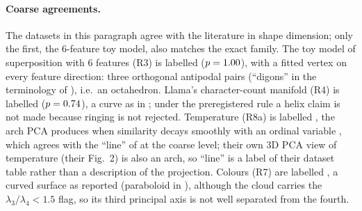 \paragraph{Coarse agreements.} The datasets in this paragraph agree with the literature in shape dimension; only the first, the 6-feature toy model, also matches the exact family. The toy model of superposition with 6 features (R3) is labelled \fitRthreetmsnsix{} ($p=1.00{}$), with a fitted vertex on every feature direction: three orthogonal antipodal pairs (``digons'' in the terminology of \citealp{elhage2022tms}), i.e.\ an octahedron. Llama's character-count manifold (R4) is labelled \fitRfourllamacounting{} ($p=0.74{}$), a curve as in \citet{gurnee2025linebreaks}; under the preregistered rule a helix claim is not made because ringing is not rejected. Temperature (R8a) is labelled \fitReightallamatemperature{}, the arch PCA produces when similarity decays smoothly with an ordinal variable \citep{novembre2008horseshoe,antognini2018walks}, which agrees with the ``line'' of \citet{bhalla2026sae} at the coarse level; their own 3D PCA view of temperature (their Fig.~2) is also an arch, so ``line'' is a label of their dataset table rather than a description of the projection. Colours (R7) are labelled \fitRsevenllamacolors{}, a curved surface as reported (paraboloid in \citealp{bhalla2026sae}), although the cloud carries the $\lambda_3/\lambda_4<1.5$ flag, so its third principal axis is not well separated from the fourth.

